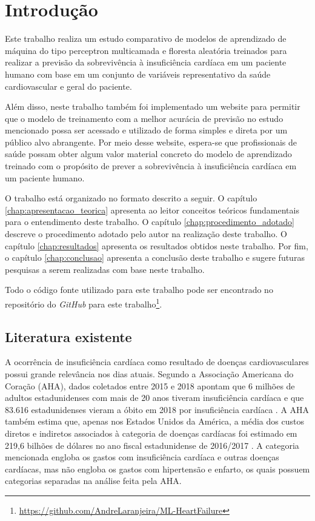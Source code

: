 \chapter{Introdução} \label{chap:introducao}

Este trabalho realiza um estudo comparativo de modelos de aprendizado de máquina do tipo perceptron multicamada e floresta aleatória treinados para realizar a previsão da sobrevivência à insuficiência cardíaca em um paciente humano com base em um conjunto de variáveis representativo da saúde cardiovascular e geral do paciente.

Além disso, neste trabalho também foi implementado um website para permitir que o modelo de treinamento com a melhor acurácia de previsão no estudo mencionado possa ser acessado e utilizado de forma simples e direta por um público alvo abrangente. Por meio desse website, espera-se que profissionais de saúde possam obter algum valor material concreto do modelo de aprendizado treinado com o propósito de prever a sobrevivência à insuficiência cardíaca em um paciente humano.

O trabalho está organizado no formato descrito a seguir. O capítulo \ref{chap:apresentacao_teorica} apresenta ao leitor conceitos teóricos fundamentais para o entendimento deste trabalho. O capítulo \ref{chap:procedimento_adotado} descreve o procedimento adotado pelo autor na realização deste trabalho. O capítulo \ref{chap:resultados} apresenta os resultados obtidos neste trabalho. Por fim, o capítulo \ref{chap:conclusao} apresenta a conclusão deste trabalho e sugere futuras pesquisas a serem realizadas com base neste trabalho.

Todo o código fonte utilizado para este trabalho pode ser encontrado no repositório do \textit{GitHub} para este trabalho\footnote{\url{https://github.com/AndreLaranjeira/ML-HeartFailure}}.

\section{Literatura existente}

A ocorrência de insuficiência cardíaca como resultado de doenças cardiovasculares possui grande relevância nos dias atuais. Segundo a Associação Americana do Coração (AHA), dados coletados entre 2015 e 2018 apontam que 6 milhões de adultos estadunidenses com mais de 20 anos tiveram insuficiência cardíaca \cite[p.8]{heart_disease2021} e que 83.616 estadunidenses vieram a óbito em 2018 por insuficiência cardíaca \cite[p.485]{heart_disease2021}. A AHA também estima que, apenas nos Estados Unidos da América, a média dos custos diretos e indiretos associados à categoria de doenças cardíacas foi estimado em 219,6 bilhões de dólares no ano fiscal estadunidense de 2016/2017 \cite[p.481]{heart_disease2021}. A categoria mencionada engloba os gastos com insuficiência cardíaca e outras doenças cardíacas, mas não engloba os gastos com hipertensão e enfarto, os quais possuem categorias separadas na análise feita pela AHA.

